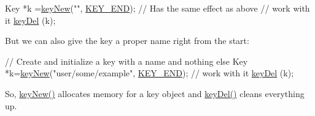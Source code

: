 \begin{DoxyCodeInclude}
Key *k =\hyperlink{group__key_gad23c65b44bf48d773759e1f9a4d43b89}{keyNew}(\textcolor{stringliteral}{""}, \hyperlink{group__key_gga91fb3178848bd682000958089abbaf40aa8adb6fcb92dec58fb19410eacfdd403}{KEY\_END}); \textcolor{comment}{// Has the same effect as above}
\textcolor{comment}{// work with it}
\hyperlink{group__key_ga3df95bbc2494e3e6703ece5639be5bb1}{keyDel} (k);
\end{DoxyCodeInclude}
 But we can also give the key a proper name right from the start\+:


\begin{DoxyCodeInclude}
\textcolor{comment}{// Create and initialize a key with a name and nothing else}
Key *k=\hyperlink{group__key_gad23c65b44bf48d773759e1f9a4d43b89}{keyNew}(\textcolor{stringliteral}{"user/some/example"}, \hyperlink{group__key_gga91fb3178848bd682000958089abbaf40aa8adb6fcb92dec58fb19410eacfdd403}{KEY\_END});
\textcolor{comment}{// work with it}
\hyperlink{group__key_ga3df95bbc2494e3e6703ece5639be5bb1}{keyDel} (k);
\end{DoxyCodeInclude}
 So, \hyperlink{group__key_gad23c65b44bf48d773759e1f9a4d43b89}{key\+New()} allocates memory for a key object and \hyperlink{group__key_ga3df95bbc2494e3e6703ece5639be5bb1}{key\+Del()} cleans everything up.

